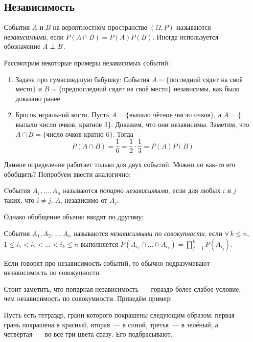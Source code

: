 \documentclass[a4paper,12pt]{article}
\begin{document}
	\subsection{Независимость}
	\begin{definition}
		События \(A\) и \(B\) на вероятностном пространстве \((\Omega, P)\) называются \emph{независимыми}, если \(P(A \cap B) = P(A)P(B)\). Иногда используется обозначение \(A \independent B\).
	\end{definition}
	Рассмотрим некоторые примеры независимых событий:
	\begin{enumerate}
		\item Задача про сумасшедшую бабушку: События \(A = \{\)последний сядет на своё место\(\}\) и \(B = \{\)предпоследний сядет на своё место\(\}\) независимы, как было доказано ранее.
		
		\item Бросок игральной кости. Пусть \(A = \{\)выпало чётное число очков\(\}\), а \(A = \{\)выпало число очков, кратное 3\(\}\). Докажем, что они независимы. Заметим, что \(A \cap B = \{\)число очков кратно 6\(\}\). Тогда \[P(A \cap B) = \frac{1}{6} = \frac{1}{2} \cdot \frac{1}{3} = P(A)P(B)\]
	\end{enumerate}
	Данное определение работает только для двух событий. Можно ли как-то его обобщить? Попробуем ввести аналогично:
	\begin{definition}
		Cобытия \(A_1, \ldots, A_n\) называются \emph{попарно независимыми}, если для любых \(i\) и \(j\) таких, что \(i \neq j\), \(A_i\) независимо от \(A_j\).
	\end{definition}
	Однако обобщение обычно вводят по другому:
	\begin{definition}
		События \(A_1, A_2, \ldots, A_n\) называются \emph{независимыми по совокупности}, если \(\forall\,k \leq n\), \(1 \leq i_1 < i_2 < \ldots < i_k \leq n\) выполняется \(P(A_{i_1}\cap\ldots\cap A_{i_k}) = \prod\limits_{j = 1}^{k} P(A_{i_j})\).
	\end{definition}
	\begin{remark}
		Если говорят про независимость событий, то обычно подразумевают независимость по совокупности.
	\end{remark}
	
	Стоит заметить, что попарная независимость~--- гораздо более слабое условие, чем независимость по совокумности. Приведём пример:
	
	Пусть есть тетраэдр, грани которого покрашены следующим образом: первая грань покрашена в красный, вторая~--- в синий, третья~--- в зелёный, а четвёртая~--- во все три цвета сразу. Его подбрасывают.
	
\end{document}
